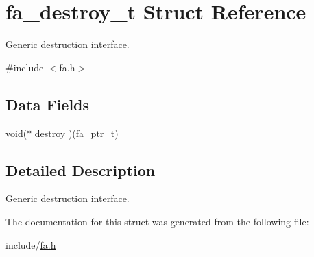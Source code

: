 \hypertarget{structfa__destroy__t}{\section{fa\-\_\-destroy\-\_\-t Struct Reference}
\label{structfa__destroy__t}
}


Generic destruction interface.  




{\ttfamily \#include $<$fa.\-h$>$}

\subsection*{Data Fields}
\begin{DoxyCompactItemize}
\item 
void($\ast$ \hyperlink{structfa__destroy__t_a0c97d29c4dff00d194620fa3c704a20b}{destroy} )(\hyperlink{group___fa_ga915ddeae99ad7568b273d2b876425197}{fa\-\_\-ptr\-\_\-t})
\end{DoxyCompactItemize}


\subsection{Detailed Description}
Generic destruction interface. 

The documentation for this struct was generated from the following file\-:\begin{DoxyCompactItemize}
\item 
include/\hyperlink{fa_8h}{fa.\-h}\end{DoxyCompactItemize}

